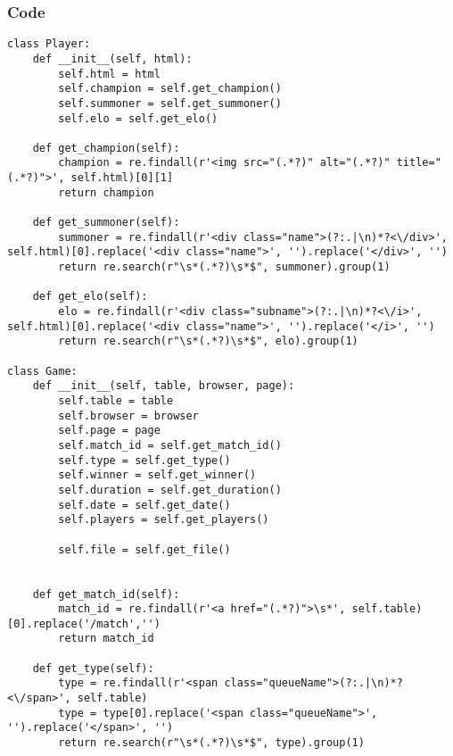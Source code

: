 \documentclass{beamer}
\begin{document}
\begin{frame}[fragile]
    \frametitle{Code}
    \fontsize{3pt}{5pt}\selectfont
    \begin{verbatim}
class Player:
    def __init__(self, html):
        self.html = html
        self.champion = self.get_champion()
        self.summoner = self.get_summoner()
        self.elo = self.get_elo()
    
    def get_champion(self):
        champion = re.findall(r'<img src="(.*?)" alt="(.*?)" title="(.*?)">', self.html)[0][1]
        return champion
    
    def get_summoner(self):
        summoner = re.findall(r'<div class="name">(?:.|\n)*?<\/div>', self.html)[0].replace('<div class="name">', '').replace('</div>', '')
        return re.search(r"\s*(.*?)\s*$", summoner).group(1)
    
    def get_elo(self):
        elo = re.findall(r'<div class="subname">(?:.|\n)*?<\/i>', self.html)[0].replace('<div class="name">', '').replace('</i>', '')
        return re.search(r"\s*(.*?)\s*$", elo).group(1)

class Game:
    def __init__(self, table, browser, page):
        self.table = table
        self.browser = browser
        self.page = page
        self.match_id = self.get_match_id()
        self.type = self.get_type()
        self.winner = self.get_winner()
        self.duration = self.get_duration()
        self.date = self.get_date()
        self.players = self.get_players()

        self.file = self.get_file()


    def get_match_id(self):
        match_id = re.findall(r'<a href="(.*?)">\s*', self.table)[0].replace('/match','')
        return match_id

    def get_type(self):
        type = re.findall(r'<span class="queueName">(?:.|\n)*?<\/span>', self.table)
        type = type[0].replace('<span class="queueName">', '').replace('</span>', '')
        return re.search(r"\s*(.*?)\s*$", type).group(1)
    \end{verbatim}
\end{frame}
\end{document}
